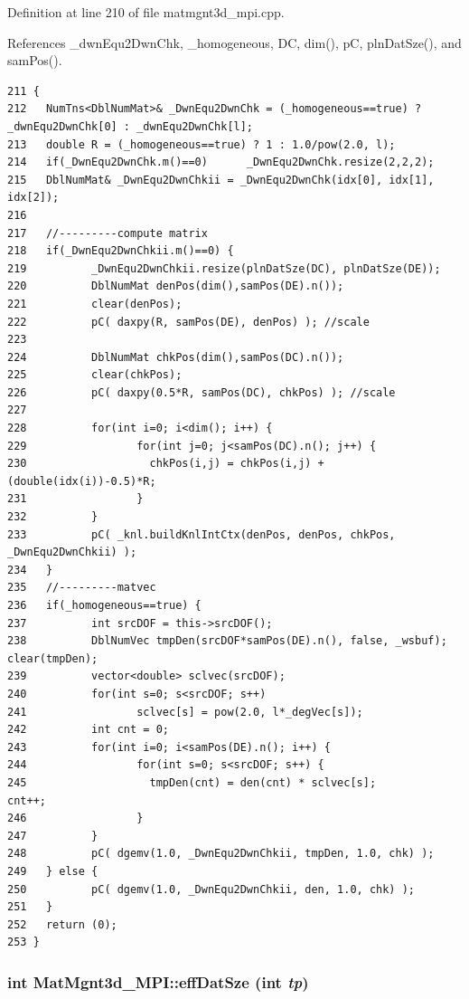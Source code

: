 Definition at line 210 of file matmgnt3d\_\-mpi.cpp.

References \_\-dwn\-Equ2Dwn\-Chk, \_\-homogeneous, DC, dim(), p\-C, pln\-Dat\-Sze(), and sam\-Pos().

\footnotesize\begin{verbatim}211 {
212   NumTns<DblNumMat>& _DwnEqu2DwnChk = (_homogeneous==true) ? _dwnEqu2DwnChk[0] : _dwnEqu2DwnChk[l];
213   double R = (_homogeneous==true) ? 1 : 1.0/pow(2.0, l);  
214   if(_DwnEqu2DwnChk.m()==0)      _DwnEqu2DwnChk.resize(2,2,2);
215   DblNumMat& _DwnEqu2DwnChkii = _DwnEqu2DwnChk(idx[0], idx[1], idx[2]);
216   
217   //---------compute matrix
218   if(_DwnEqu2DwnChkii.m()==0) {  
219          _DwnEqu2DwnChkii.resize(plnDatSze(DC), plnDatSze(DE)); 
220          DblNumMat denPos(dim(),samPos(DE).n());
221          clear(denPos);
222          pC( daxpy(R, samPos(DE), denPos) ); //scale
223 
224          DblNumMat chkPos(dim(),samPos(DC).n());
225          clear(chkPos);
226          pC( daxpy(0.5*R, samPos(DC), chkPos) ); //scale
227 
228          for(int i=0; i<dim(); i++) {
229                 for(int j=0; j<samPos(DC).n(); j++) {
230                   chkPos(i,j) = chkPos(i,j) + (double(idx(i))-0.5)*R;
231                 }
232          }
233          pC( _knl.buildKnlIntCtx(denPos, denPos, chkPos, _DwnEqu2DwnChkii) );
234   }
235   //---------matvec
236   if(_homogeneous==true) {
237          int srcDOF = this->srcDOF();
238          DblNumVec tmpDen(srcDOF*samPos(DE).n(), false, _wsbuf);         clear(tmpDen);
239          vector<double> sclvec(srcDOF);
240          for(int s=0; s<srcDOF; s++)
241                 sclvec[s] = pow(2.0, l*_degVec[s]);
242          int cnt = 0;
243          for(int i=0; i<samPos(DE).n(); i++) {
244                 for(int s=0; s<srcDOF; s++) {
245                   tmpDen(cnt) = den(cnt) * sclvec[s];             cnt++;
246                 }
247          }
248          pC( dgemv(1.0, _DwnEqu2DwnChkii, tmpDen, 1.0, chk) );
249   } else {
250          pC( dgemv(1.0, _DwnEqu2DwnChkii, den, 1.0, chk) );
251   }
252   return (0);
253 }
\end{verbatim}\normalsize 


\subsubsection{\setlength{\rightskip}{0pt plus 5cm}int Mat\-Mgnt3d\_\-MPI::eff\-Dat\-Sze (int {\em tp})}\label{classMatMgnt3d__MPI_2ce9326034b7f6cfc6196785759829e1_2ce9326034b7f6cfc6196785759829e1}



